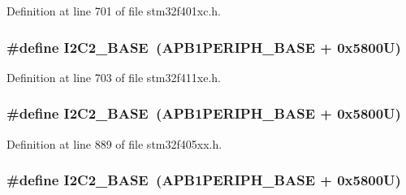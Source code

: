 Definition at line 701 of file stm32f401xc.\+h.

\subsubsection[{\texorpdfstring{I2\+C2\+\_\+\+B\+A\+SE}{I2C2_BASE}}]{\setlength{\rightskip}{0pt plus 5cm}\#define I2\+C2\+\_\+\+B\+A\+SE~({\bf A\+P\+B1\+P\+E\+R\+I\+P\+H\+\_\+\+B\+A\+SE} + 0x5800\+U)}\hypertarget{group___peripheral__registers__structures_ga04bda70f25c795fb79f163b633ad4a5d}{}\label{group___peripheral__registers__structures_ga04bda70f25c795fb79f163b633ad4a5d}


Definition at line 703 of file stm32f411xe.\+h.

\subsubsection[{\texorpdfstring{I2\+C2\+\_\+\+B\+A\+SE}{I2C2_BASE}}]{\setlength{\rightskip}{0pt plus 5cm}\#define I2\+C2\+\_\+\+B\+A\+SE~({\bf A\+P\+B1\+P\+E\+R\+I\+P\+H\+\_\+\+B\+A\+SE} + 0x5800\+U)}\hypertarget{group___peripheral__registers__structures_ga04bda70f25c795fb79f163b633ad4a5d}{}\label{group___peripheral__registers__structures_ga04bda70f25c795fb79f163b633ad4a5d}


Definition at line 889 of file stm32f405xx.\+h.

\subsubsection[{\texorpdfstring{I2\+C2\+\_\+\+B\+A\+SE}{I2C2_BASE}}]{\setlength{\rightskip}{0pt plus 5cm}\#define I2\+C2\+\_\+\+B\+A\+SE~({\bf A\+P\+B1\+P\+E\+R\+I\+P\+H\+\_\+\+B\+A\+SE} + 0x5800\+U)}\hypertarget{group___peripheral__registers__structures_ga04bda70f25c795fb79f163b633ad4a5d}{}\label{group___peripheral__registers__structures_ga04bda70f25c795fb79f163b633ad4a5d}


